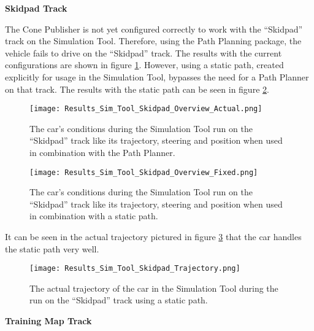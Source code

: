 \textbf{Skidpad Track}

The Cone Publisher is not yet configured correctly to work with the ``Skidpad'' track on the Simulation Tool. Therefore, using the Path Planning package, the vehicle fails to drive on the ``Skidpad'' track. The results with the current configurations are shown in figure \ref{fig:Results Sim Tool Skidpad Overview Actual}.
However, using a static path, created explicitly for usage in the Simulation Tool, bypasses the need for a Path Planner on that track. The results with the static path can be seen in figure \ref{fig:Results Sim Tool Skidpad Overview Fixed}.
\begin{figure}[H]
    \centering
    \texttt{[image: Results\_Sim\_Tool\_Skidpad\_Overview\_Actual.png]}
    \caption{The car's conditions during the Simulation Tool run on the ``Skidpad'' track like its trajectory, steering and position when used in combination with the Path Planner.}
    \label{fig:Results Sim Tool Skidpad Overview Actual}
\end{figure}
\begin{figure}[H]
    \centering
    \texttt{[image: Results\_Sim\_Tool\_Skidpad\_Overview\_Fixed.png]}
    \caption{The car's conditions during the Simulation Tool run on the ``Skidpad'' track like its trajectory, steering and position when used in combination with a static path.}
    \label{fig:Results Sim Tool Skidpad Overview Fixed}
\end{figure}

It can be seen in the actual trajectory pictured in figure \ref{fig:Results Sim Tool Skidpad Trajectory} that the car handles the static path very well.
\begin{figure}[H]
    \centering
    \texttt{[image: Results\_Sim\_Tool\_Skidpad\_Trajectory.png]}
    \caption{The actual trajectory of the car in the Simulation Tool during the run on the ``Skidpad'' track using a static path.}
    \label{fig:Results Sim Tool Skidpad Trajectory}
\end{figure}

\pagebreak

\textbf{Training Map Track}

